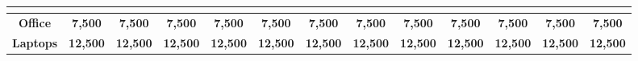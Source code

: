 \begin{center}
\begin{table}[!htbp]
{\begin{tabular}{|c|c|c|c|c|c|c|c|c|c|c|c|c|}
\multicolumn{13}{|c|}{\cellcolor[HTML]{C0C0C0}{\color[HTML]{343434} \textbf{Capex}}}                                                                                                                                                                                                                                                                                                                                                                                                                                                                                                                                                                                                                                                                                                                                                                                                                                                                                                                                                                     \\ \hline
\rowcolor[HTML]{FFFFFF} 
\cellcolor[HTML]{FFFFFF}\textbf{Office}                                                             & \cellcolor[HTML]{FFFFFF}\textbf{7,500}                    & \textbf{7,500}                           & \textbf{7,500}                           & \textbf{7,500}                           & \textbf{7,500}                                                                           & \textbf{7,500}                                                                           & \textbf{7,500}                                                                           & \textbf{7,500}                                                                           & \textbf{7,500}                                                                           & \textbf{7,500}                                                                           & \textbf{7,500}                                                                           & \textbf{7,500}                                                                           \\ \hline
\rowcolor[HTML]{FFFFFF} 
\cellcolor[HTML]{FFFFFF}\textbf{Laptops}                                                            & \cellcolor[HTML]{FFFFFF}\textbf{12,500}                   & \textbf{12,500}                          & \textbf{12,500}                          & \textbf{12,500}                          & \textbf{12,500}                                                                          & \textbf{12,500}                                                                          & \textbf{12,500}                                                                          & \textbf{12,500}                                                                          & \textbf{12,500}                                                                          & \textbf{12,500}                                                                          & \textbf{12,500}                                                                          & \textbf{12,500}                                                                          \\ \hline

\end{tabular}}
\end{table}
\end{center}
